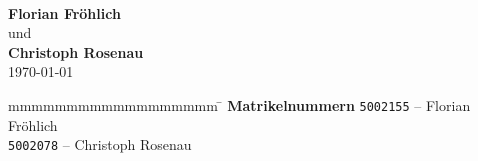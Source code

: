 \begin{titlepage}
\begin{center}
		\vspace*{12mm}	\langvon\\
		\vspace*{3mm}		{\large\textbf{Florian Fröhlich}}\\
		\vspace*{3mm}		{und}\\
		\vspace*{3mm}		{\large\textbf{Christoph Rosenau}}\\
		\vspace*{12mm}	\today\\
	\end{center}
	\vfill
	\begin{spacing}{1.2}
	\begin{tabbing}
		mmmmmmmmmmmmmmmmmm             \= \kill
		\textbf{Matrikelnummern}  \>  \texttt{5002155} -- Florian Fröhlich\\
								\>  \texttt{5002078} -- Christoph Rosenau\\
		\textbf{\langdbgutachter}              \>  \gutachter
	\end{tabbing}
	\end{spacing}
\end{titlepage}
